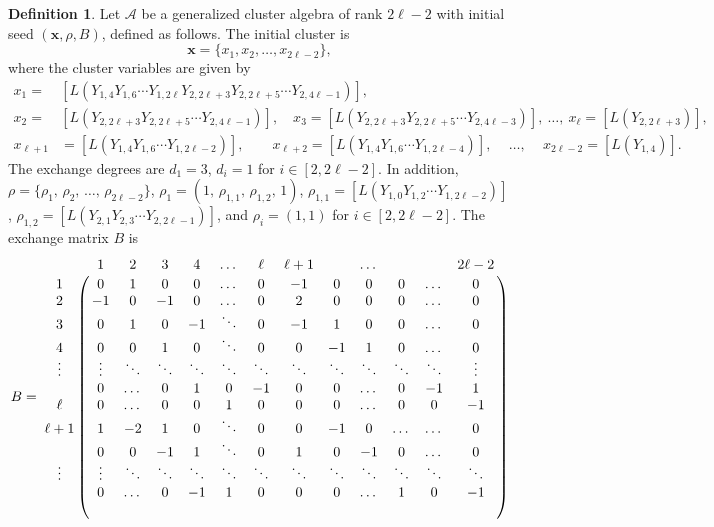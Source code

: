 \documentclass[11pt, reqno]{amsart}
\theoremstyle{plain}
\theoremstyle{definition}
\newtheorem{definition}[theorem]{Definition}
\numberwithin{equation}{section}
\begin{document}
\begin{definition}\label{Def:generalized cluster algebras of $A_2$}
Let $\mathcal{A}$ be a generalized cluster algebra of rank $2 \ell-2$ with initial seed $(\mathbf{x},\rho, B)$, defined as follows.
The initial cluster is 
\[
\mathbf{x} = \{x_1, x_2, \ldots, x_{2\ell-2}\},
\]
where the cluster variables are given by
\begin{align*}
x_1 =& [L(Y_{1,4}Y_{1,6}\cdots Y_{1, 2 \ell}Y_{2,2\ell+3}Y_{2,2\ell+5}\cdots Y_{2,4\ell -1})],\\
x_2 =& [L(Y_{2,2\ell+3}Y_{2,2\ell+5}\cdots Y_{2,4\ell -1})], \quad
x_3 = [L(Y_{2,2\ell+3}Y_{2,2\ell+5}\cdots Y_{2,4\ell -3})], \ \ldots, \ 
x_\ell = [L(Y_{2,2\ell+3})],\\
x_{\ell+1}& = [L(Y_{1,4}Y_{1,6}\cdots Y_{1, 2 \ell-2})], \qquad
x_{\ell+2} = [L(Y_{1,4}Y_{1,6}\cdots Y_{1, 2 \ell-4})], \,\quad\ldots, \,\quad
x_{2\ell-2} = [L(Y_{1,4})].
\end{align*}
The exchange degrees are $d_1=3$, $d_i=1$ for $i\in[2,2\ell-2]$. In addition, $\rho=\{\rho_1,\,\rho_2,\,\ldots,\,\rho_{2\ell-2}\}$, $\rho_1=(1,\,\rho_{1,1},\, \rho_{1,2},\, 1)$, $\rho_{1,1}=[L(Y_{1,0}Y_{1,2}\cdots Y_{1,2\ell-2})]$, $\rho_{1,2}=[L(Y_{2,1}Y_{2,3}\cdots Y_{2,2\ell-1})]$, and $\rho_i=(1,1)$ for $i\in[2, 2\ell-2]$. The exchange matrix $B$ is
\begin{equation}\label{exchhange matrix}
 B=
\bordermatrix{
&1  &2   &3   &4 &\dots &\ell & \ell+1 &&\dots &&& 2\ell-2\cr\\
1 &0&1&0&0&\dots&0&-1&0&0 &0 & \dots &0\cr\\
2 &-1&0&-1&0&\dots &0 &2&0& 0&0 & \dots &0\cr \\
3 &0&1&0&-1&\ddots& 0&-1&1&0  &0 & \dots &0 \cr     \\
4 &0&0&1&0&\ddots&0&0&-1&1&0 & \dots &0\cr            \\
\vdots&\vdots&\ddots&\ddots&\ddots&\ddots&\ddots&\ddots&\ddots&\ddots&\ddots&\ddots&\vdots\cr\\
&0&\dots&0&1&0&-1&0&0&\dots&0&-1&1\cr\\
\ell &0&\dots&0&0&1&0&0&0&\dots&0&0&-1\cr\\
\ell +1 &1&-2&1&0&\ddots&0&0&-1&0&\dots& \dots &0\cr\\
&0&0&-1&1 &\ddots&0&1&0&-1&0&\dots  &0\cr\\
\vdots &\vdots&\ddots&\ddots&\ddots&\ddots&\ddots&\ddots&\ddots& \ddots&\ddots&\ddots&\ddots\cr\\
&0&\dots &0&-1 &1&0&0&0&\dots&    1&0&-1\cr\\
}
\end{equation}
\end{definition}
\end{document}
